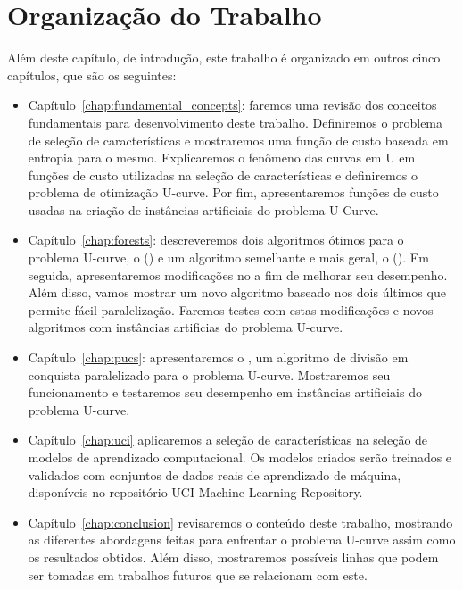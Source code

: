 \section{Organização do Trabalho}
Além deste capítulo, de introdução, este trabalho é organizado em outros
cinco capítulos, que são os seguintes:
\begin{itemize}
    \item{Capítulo~\ref{chap:fundamental_concepts}:} faremos uma revisão
        dos conceitos fundamentais para desenvolvimento deste trabalho. 
        Definiremos o problema de seleção de características e 
        mostraremos uma função de custo baseada em entropia para o 
        mesmo. Explicaremos o fenômeno das curvas em U em funções de
        custo utilizadas na seleção de características e definiremos
        o problema de otimização U-curve. Por fim, apresentaremos
        funções de custo usadas na criação de instâncias artificiais do  
        problema U-Curve.
    \item{Capítulo~\ref{chap:forests}:} descreveremos dois algoritmos
        ótimos para o problema U-curve, o 
         () e um 
        algoritmo semelhante e mais geral, o 
         (). Em seguida, 
        apresentaremos modificações no  a fim de  melhorar
        seu desempenho. Além disso, vamos mostrar um novo algoritmo
        baseado nos dois últimos que permite fácil paralelização. 
        Faremos testes com estas modificações e novos algoritmos com
        instâncias artificias do problema U-curve.
    \item{Capítulo~\ref{chap:pucs}:} apresentaremos o 
        , um algoritmo de 
        divisão em conquista paralelizado para o problema U-curve. 
        Mostraremos seu funcionamento e testaremos seu desempenho em 
        instâncias artificiais do problema U-curve.
    \item{Capítulo~\ref{chap:uci}} aplicaremos a seleção de 
        características na seleção de modelos de aprendizado 
        computacional. Os modelos criados serão treinados e validados
        com conjuntos de dados reais de aprendizado de máquina, 
        disponíveis no repositório UCI Machine Learning Repository.
    \item{Capítulo~\ref{chap:conclusion}} revisaremos o conteúdo deste
        trabalho, mostrando as diferentes abordagens feitas para 
        enfrentar o problema U-curve assim como os resultados obtidos.
        Além disso, mostraremos possíveis linhas que podem ser tomadas 
        em trabalhos futuros que se relacionam com este.
\end{itemize}

